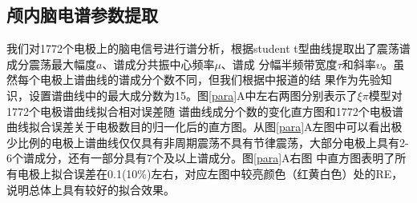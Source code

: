 \subsection{颅内脑电谱参数提取}
我们对1772个电极上的脑电信号进行谱分析，根据student t型曲线提取出了震荡谱成分震荡最大幅度$a$、谱成分共振中心频率$\mu$、谱成
分幅半频带宽度$\tau$和斜率$\upsilon$。虽然每个电极上谱曲线的谱成分个数不同，但我们根据\cite{frauscher2018atlas}中报道的结
果作为先验知识，设置谱曲线中的最大成分数为15。图\ref{para}A中左右两图分别表示了$\xi\pi$模型对1772个电极谱曲线拟合相对误差随
谱曲线成分个数的变化直方图和1772个电极谱曲线拟合误差关于电极数目的归一化后的直方图。从图\ref{para}A左图中可以看出极少比例的电极上谱曲线仅仅具有非周期震荡不具有节律震荡，大部分电极上具有2-6个谱成分，还有一部分具有7个及以上谱成分。图\ref{para}A右图
中直方图表明了所有电极上拟合误差在0.1(10\%)左右，对应左图中较亮颜色（红黄白色）处的RE，说明总体上具有较好的拟合效果。

